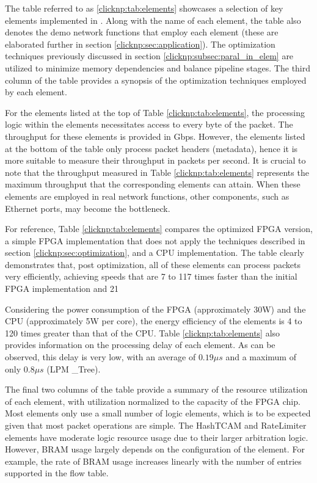 The table referred to as \ref {clicknp:tab:elements} showcases a selection of key elements implemented in \name. Along with the name of each element, the table also denotes the demo network functions that employ each element (these are elaborated further in section \ref {clicknp:sec:application}). The optimization techniques previously discussed in section \ref {clicknp:subsec:paral_in_elem} are utilized to minimize memory dependencies and balance pipeline stages. The third column of the table provides a synopsis of the optimization techniques employed by each element. 

For the elements listed at the top of Table \ref {clicknp:tab:elements}, the processing logic within the elements necessitates access to every byte of the packet. The throughput for these elements is provided in Gbps. However, the elements listed at the bottom of the table only process packet headers (metadata), hence it is more suitable to measure their throughput in packets per second. It is crucial to note that the throughput measured in Table \ref {clicknp:tab:elements} represents the maximum throughput that the corresponding elements can attain. When these elements are employed in real network functions, other components, such as Ethernet ports, may become the bottleneck. 

For reference, Table \ref {clicknp:tab:elements} compares the optimized FPGA version, a simple FPGA implementation that does not apply the techniques described in section \ref {clicknp:sec:optimization}, and a CPU implementation. The table clearly demonstrates that, post optimization, all of these elements can process packets very efficiently, achieving speeds that are 7 to 117 times faster than the initial FPGA implementation and 21%

Considering the power consumption of the FPGA (approximately 30W) and the CPU (approximately 5W per core), the energy efficiency of the \name elements is 4 to 120 times greater than that of the CPU. Table \ref {clicknp:tab:elements} also provides information on the processing delay of each element. As can be observed, this delay is very low, with an average of $0.19 \mu s$ and a maximum of only $0.8 \mu s$ (LPM \_Tree).

The final two columns of the table provide a summary of the resource utilization of each element, with utilization normalized to the capacity of the FPGA chip. Most elements only use a small number of logic elements, which is to be expected given that most packet operations are simple. The HashTCAM and RateLimiter elements have moderate logic resource usage due to their larger arbitration logic. However, BRAM usage largely depends on the configuration of the element. For example, the rate of BRAM usage increases linearly with the number of entries supported in the flow table. 

